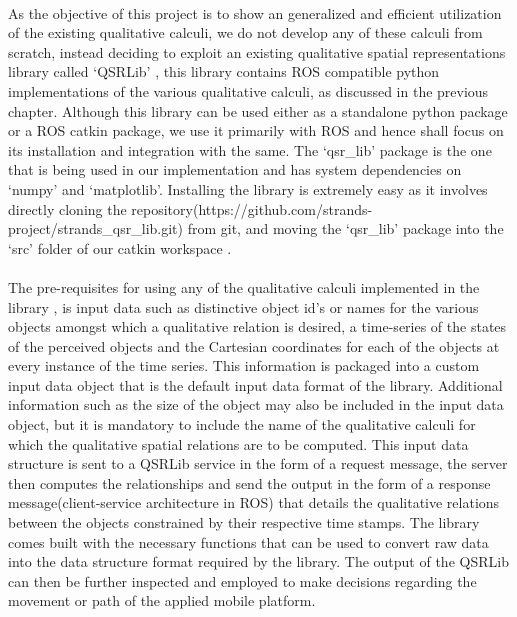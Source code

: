 \paragraph{}As the objective of this project is to show an generalized and efficient utilization of the existing qualitative calculi, we do not develop any of these calculi from scratch, instead deciding to exploit an existing qualitative spatial representations library called `QSRLib' \cite{gatsoulis2016qsrlib}, this library contains ROS compatible  python implementations of the various qualitative calculi, as discussed in the previous chapter. Although this library can be used either as a standalone python package or a ROS catkin package, we use it primarily with ROS and hence shall focus on its installation and integration with the same. The `qsr\_lib' package is the one that is being used in our implementation and has system dependencies on `numpy' and `matplotlib'. Installing the library is extremely easy as it involves directly cloning the repository(https://github.com/strands-project/strands\_qsr\_lib.git) from git, and moving the `qsr\_lib' package into the `src' folder of our catkin workspace \cite{qsrlib}. 

\paragraph{}The pre-requisites for using any of the qualitative calculi implemented in the library \cite{qsrlib}, \cite{gatsoulis2016qsrlib} is input data such as distinctive object id's or names for the various objects amongst which a qualitative relation is desired, a time-series of the states of the perceived objects and the Cartesian coordinates for each of the objects at every instance of the time series. This information is packaged into a custom input data object that is the default input data format of the library. Additional information such as the size of the object may also be included in the input data object, but it is mandatory to include the name of the qualitative calculi for which the qualitative spatial relations are to be computed. This input data structure is sent to a QSRLib service in the form of a request message, the server then computes the relationships and send the output in the form of a response message(client-service architecture in ROS) that details the qualitative relations between the objects constrained by their respective time stamps. The library comes built with the necessary functions that can be used to convert raw data into the data structure format required by the library. The output of the QSRLib can then be further inspected and employed to make decisions regarding the movement or path of the applied mobile platform.

